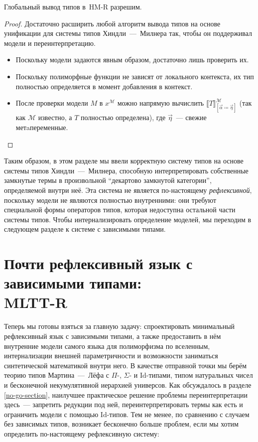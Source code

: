 \begin{theorem}
    Глобальный вывод типов в~HM-R разрешим.
\end{theorem}
\begin{proof}
    Достаточно расширить любой алгоритм вывода типов на
    основе унификации для системы типов
    Хиндли~---~Милнера так, чтобы он поддерживал модели
    и переинтерпретацию.
    \begin{itemize}
        \item Поскольку модели задаются явным образом,
            достаточно лишь проверить их.
        \item Поскольку полиморфные функции не зависят
            от локального контекста, их тип полностью
            определяется в момент добавления в
            контекст.
        \item После проверки модели $M$ в
            $x^\mathcal{M}$ можно напрямую вычислить
            $\llbracket T\rrbracket^\mathcal{M}_{[
            \vec{\alpha}\coloneqq\vec{\eta}]}$ (так как
            $\mathcal{M}$ известно, а $T$ полностью
            определена), где $\vec{\eta}$~--- свежие
            метaпеременные.
    \end{itemize}
\end{proof}

Таким образом, в этом разделе мы ввели корректную
систему типов на основе системы типов
Хиндли~---~Милнера, способную интерпретировать
собственные замкнутые термы в произвольной ``декартово
замкнутой категории'', определяемой внутри неё. Эта
система не является по-настоящему
\textit{рефлексивной}, поскольку модели не являются
полностью внутренними: они требуют специальной формы
операторов типов, которая недоступна остальной части
системы типов. Чтобы интернализировать определение
моделей, мы переходим в следующем разделе к системе с
зависимыми типами.

\section
[Почти рефлексивный язык с зависимыми типами: MLTT-R]
{Почти рефлексивный язык с зависимыми типами: \\
MLTT-R}
\label{MLTT-R}

Теперь мы готовы взяться за главную задачу:
спроектировать минимальный рефлексивный язык с
зависимыми типами, а также предоставить в нём
внутренние модели самого языка для полиморфизма по
вселенным, интернализации внешней параметричности и
возможности заниматься синтетической математикой внутри
него. В качестве отправной точки мы берём теорию типов
Мартина~---~Лёфа с $\Pi$-, $\Sigma$- и
$\mathrm{Id}$-типами, типом натуральных чисел и
бесконечной некумулятивной иерархией универсов. Как
обсуждалось в разделе \ref{no-go-section}, наилучшее
практическое решение проблемы переинтерпретации
здесь~--- запретить редукции под ней,
переинтерпретировать термы как есть и ограничить модели
с помощью $\mathrm{Id}$-типов. Тем не менее, по
сравнению с случаем без зависимых типов, возникает
бесконечно больше проблем, если мы хотим определить
по-настоящему рефлексивную систему:

